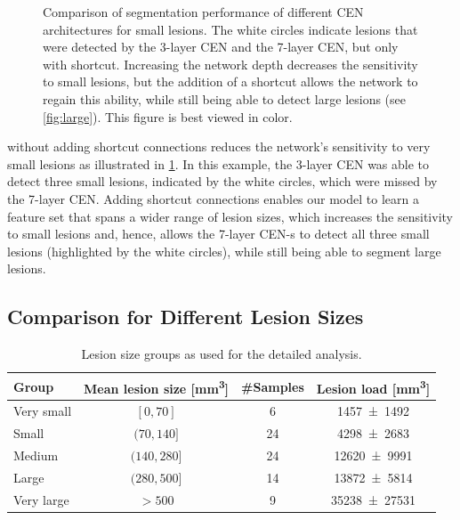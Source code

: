 \begin{figure}[p]
\caption[Comparison of segmentation performance of different CEN architectures
for small lesions]{Comparison of segmentation performance of different CEN architectures
for small lesions. The white circles indicate lesions that were detected by the
3-layer CEN and the 7-layer CEN, but only with shortcut. Increasing the network
depth decreases the sensitivity to small lesions, but the addition of a
shortcut allows the network to regain this ability, while still being able to
detect large lesions (see \ref{fig:large}). This figure is best viewed in
color.}
\label{fig:small}
\end{figure}


\noindent without adding shortcut connections
reduces the network's sensitivity to very small lesions as illustrated in
\ref{fig:small}. In this example, the 3-layer CEN was able to detect three small
lesions, indicated by the white circles, which were missed by the 7-layer CEN.
Adding shortcut connections enables our model to learn a feature set that spans
a wider range of lesion sizes, which increases the sensitivity to small lesions
and, hence, allows the 7-layer \mbox{CEN-s} to detect all three small lesions
(highlighted by the white circles), while still being able to segment large
lesions.

\subsection[Comparison for different lesion sizes]{Comparison for Different
Lesion Sizes}

\begin{table}[tb]
\caption{Lesion size groups as used for the detailed analysis.}
\label{tab:groups}
\centering
\begin{tabular}{@{}lccc@{}}
\toprule
Group & Mean lesion size [\si{\cubic\milli\metre}] & \#Samples & Lesion
load [\si{\cubic\milli\metre}] \\
\midrule
Very small & $[0,70]$ & 6 & \num{1457+-1492} \\
Small      & $(70,140]$ & 24 & \num{4298+-2683} \\
Medium & $(140,280]$ & 24 & \num{12620+-9991} \\
Large & $(280,500]$ & 14 & \num{13872+-5814} \\
Very large & $> 500$ & 9 & \num{35238+-27531} \\
\bottomrule
\end{tabular}
\end{table}

